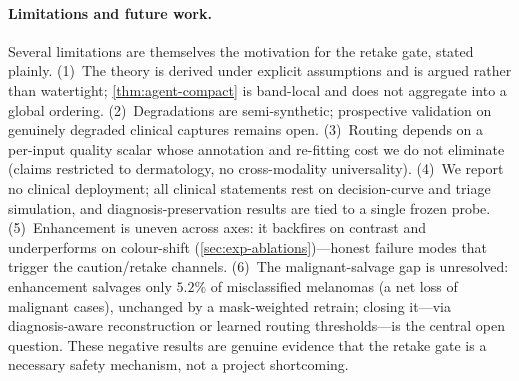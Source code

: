 \paragraph{Limitations and future work.}
Several limitations are themselves the motivation for the retake gate, stated plainly.
(1)~The theory is derived under explicit assumptions and is argued rather than
watertight; \cref{thm:agent-compact} is band-local and does not aggregate into a
global ordering.
(2)~Degradations are semi-synthetic; prospective validation on genuinely degraded
clinical captures remains open.
(3)~Routing depends on a per-input quality scalar whose annotation and re-fitting cost
we do not eliminate (claims restricted to dermatology, no cross-modality universality).
(4)~We report no clinical deployment; all clinical statements rest on decision-curve and
triage simulation, and diagnosis-preservation results are tied to a single frozen probe.
(5)~Enhancement is uneven across axes: it backfires on contrast and underperforms on
colour-shift (\cref{sec:exp-ablations})---honest failure modes that trigger the
caution/retake channels.
(6)~The malignant-salvage gap is unresolved: enhancement salvages only $5.2\%$ of
misclassified melanomas (a net loss of malignant cases), unchanged by a mask-weighted
retrain; closing it---via diagnosis-aware reconstruction or learned routing
thresholds---is the central open question. These negative results are genuine evidence
that the retake gate is a necessary safety mechanism, not a project shortcoming.
